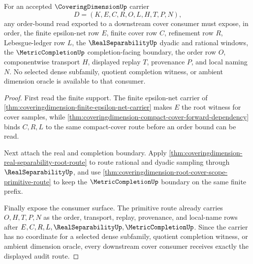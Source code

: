 \begin{theorem}
\label{thm:coveringdimension-root-cover-scope-audit}
For an accepted $\CoveringDimensionUp$ carrier
$$
D=(K,E,C,R,O,L,H,T,P,N),
$$
any order-bound read exported to a downstream cover consumer must expose,
in order, the finite epsilon-net row $E$, finite cover row $C$,
refinement row $R$, Lebesgue-ledger row $L$, the $\RealSeparabilityUp$
dyadic and rational windows, the $\MetricCompletionUp$ completion-facing
boundary, the order row $O$, componentwise transport $H$, displayed
replay $T$, provenance $P$, and local naming $N$. No selected dense
subfamily, quotient completion witness, or ambient dimension oracle is
available to that consumer.
\end{theorem}
\begin{proof}
First read the finite support. The finite epsilon-net carrier of
\autoref{thm:coveringdimension-finite-epsilon-net-carrier} makes $E$ the
root witness for cover samples, while
\autoref{thm:coveringdimension-compact-cover-forward-dependency} binds
$C,R,L$ to the same compact-cover route before an order bound can be read.

Next attach the real and completion boundary. Apply
\autoref{thm:coveringdimension-real-separability-root-route} to route
rational and dyadic sampling through $\RealSeparabilityUp$, and use
\autoref{thm:coveringdimension-root-cover-scope-primitive-route} to keep
the $\MetricCompletionUp$ boundary on the same finite prefix.

Finally expose the consumer surface. The primitive route already carries
$O,H,T,P,N$ as the order, transport, replay, provenance, and local-name
rows after $E,C,R,L,\RealSeparabilityUp,\MetricCompletionUp$. Since the
carrier has no coordinate for a selected dense subfamily, quotient
completion witness, or ambient dimension oracle, every downstream cover
consumer receives exactly the displayed audit route.
\end{proof}

